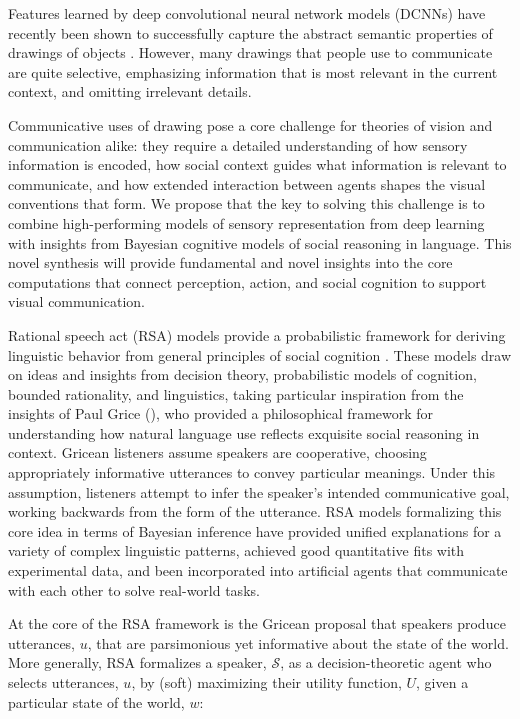 \documentclass[manuscript]{stjour}
\begin{document}
Features learned by deep convolutional neural network models (DCNNs) have recently been shown to successfully capture the abstract semantic properties of drawings of objects \cite[]{fan2015common,yamins2014performance}. However, many drawings that people use to communicate are quite selective, emphasizing information that is most relevant in the current context, and omitting irrelevant details. 

Communicative uses of drawing pose a core challenge for theories of vision and communication alike: they require a detailed understanding of how sensory information is encoded, how social context guides what information is relevant to communicate, and how extended interaction between agents shapes the visual conventions that form. We propose that the key to solving this challenge is to combine high-performing models of sensory representation from deep learning with insights from Bayesian cognitive models of social reasoning in language. This novel synthesis will provide fundamental and novel insights into the core computations that connect perception, action, and social cognition to support visual communication.

Rational speech act (RSA) models provide a probabilistic framework for deriving linguistic behavior from general principles of social cognition \cite[for a recent review]{GoodmanFrank16_RSATiCS}. These models draw on ideas and insights from decision theory, probabilistic models of cognition, bounded rationality, and linguistics, taking particular inspiration from the insights of Paul Grice (\citeyear{Grice75_LogicConversation}), who provided a philosophical framework for understanding how natural language use reflects exquisite social reasoning in context. Gricean listeners assume speakers are cooperative, choosing appropriately informative utterances to convey particular meanings. Under this assumption, listeners attempt to infer the speaker's intended communicative goal, working backwards from the form of the utterance. RSA models formalizing this core idea in terms of Bayesian inference have provided unified explanations for a variety of complex linguistic patterns, achieved good quantitative fits with experimental data, and been incorporated into artificial agents that communicate with each other to solve real-world tasks.

At the core of the RSA framework is the Gricean proposal that speakers produce utterances, $u$, that are parsimonious yet informative about the state of the world. More generally, RSA formalizes a speaker, $\mathcal{S}$, as a decision-theoretic agent who selects utterances, $u$, by (soft) maximizing their utility function, $U$, given a particular state of the world, $w$: 
\end{document}
